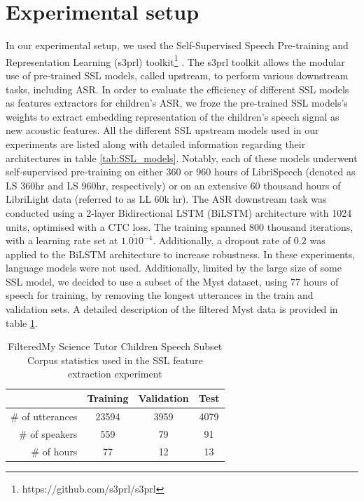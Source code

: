 \section{Experimental setup}
In our experimental setup, we used the Self-Supervised Speech Pre-training and Representation Learning (s3prl) toolkit\footnote{https://github.com/s3prl/s3prl} \cite{yang21c_interspeech}. The s3prl toolkit allows the modular use of pre-trained \ac{SSL} models, called upstream, to perform various downstream tasks, including \ac{ASR}. In order to evaluate the efficiency of different \ac{SSL} models as features extractors for children's \ac{ASR}, we froze the pre-trained \ac{SSL} models's weights to extract embedding representation of the children's speech signal as new acoustic features. All the different \ac{SSL} upstream models used in our experiments are listed along with detailed information regarding their architectures in table \ref{tab:SSL_models}. Notably, each of these models underwent self-supervised pre-training on either 360 or 960 hours of LibriSpeech \cite{librispeech} (denoted as LS 360hr and LS 960hr, respectively) or on an extensive 60 thousand hours of LibriLight data \cite{librilight} (referred to as LL 60k hr). 
The \ac{ASR} downstream task was conducted using a 2-layer Bidirectional \ac{LSTM} (BiLSTM) architecture with 1024 units, optimised with a \ac{CTC} loss. The training spanned 800 thousand iterations, with a learning rate set at $1.0\dot 10^{-4}$. Additionally, a dropout rate of $0.2$ was applied to the BiLSTM architecture to increase robustness. In these experiments, language models were not used. Additionally, limited by the large size of some \ac{SSL} model, we decided to use a subset of the Myst \cite{MyST} dataset, using 77 hours of speech for training, by removing the longest utterances in the train and validation sets. A detailed description of the filtered Myst data is provided in table \ref{tab:SSL_myst}.
\begin{table}[h!]

    
    \begin{center}
    \begin{tabular}{r|ccc}
    \hline
     & Training & Validation     & Test   \\ \hline
    \# of utterances & 23594   & 3959    & 4079  \\ 
    \# of speakers & 559  & 79    & 91  \\ 
    \# of hours & 77   & 12    & 13  \\ \hline
    \end{tabular}
    \caption{FilteredMy Science Tutor Children Speech Subset Corpus statistics used in the \ac{SSL} feature extraction experiment}
    \label{tab:SSL_myst}
    \end{center}
    \end{table}


